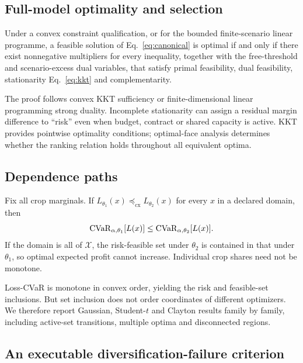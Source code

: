 \subsection{Full-model optimality and selection}

\begin{theorem}
\label{thm:kkt}
Under a convex constraint qualification, or for the bounded finite-scenario
linear programme, a feasible solution of Eq.~\ref{eq:canonical} is optimal if
and only if there exist nonnegative multipliers for every inequality,
together with the free-threshold and scenario-excess dual variables, that
satisfy primal feasibility, dual feasibility, stationarity
Eq.~\ref{eq:kkt} and complementarity.
\end{theorem}

The proof follows convex KKT sufficiency or finite-dimensional linear
programming strong duality. Incomplete stationarity can assign a residual
margin difference to ``risk'' even when budget, contract or shared capacity is
active. KKT provides pointwise optimality conditions; optimal-face analysis
determines whether the ranking relation holds throughout all equivalent
optima.

\subsection{Dependence paths}

\begin{proposition}
\label{prop:convexorder}
Fix all crop marginals. If
\(L_{\theta_1}(x)\preceq_{\mathrm{cx}}L_{\theta_2}(x)\) for every
\(x\) in a declared domain, then
\[
\operatorname{CVaR}_{\alpha,\theta_1}[L(x)]
\le \operatorname{CVaR}_{\alpha,\theta_2}[L(x)].
\]
If the domain is all of \(\mathcal X\), the risk-feasible set under
\(\theta_2\) is contained in that under \(\theta_1\), so optimal expected
profit cannot increase. Individual crop shares need not be monotone.
\end{proposition}

Loss-CVaR is monotone in convex order, yielding the risk and feasible-set
inclusions. But set inclusion does not order coordinates of different
optimizers. We therefore report Gaussian, Student-\(t\) and Clayton results
family by family, including active-set transitions, multiple optima and
disconnected regions.

\subsection{An executable diversification-failure criterion}

